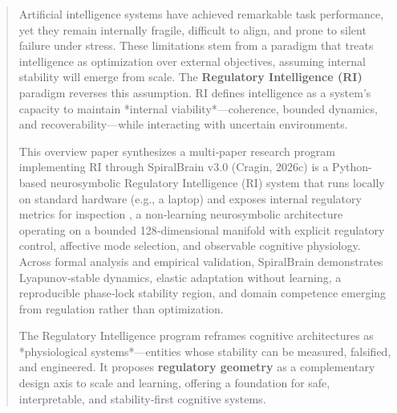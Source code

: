 \documentclass[12pt,a4paper]{report}
\begin{document}
\begin{abstract}

Artificial intelligence systems have achieved remarkable task performance, yet they remain internally fragile, difficult to align, and prone to silent failure under stress. These limitations stem from a paradigm that treats intelligence as optimization over external objectives, assuming internal stability will emerge from scale. The \textbf{Regulatory Intelligence (RI)} paradigm reverses this assumption. RI defines intelligence as a system's capacity to maintain *internal viability*—coherence, bounded dynamics, and recoverability—while interacting with uncertain environments.  

This overview paper synthesizes a multi‑paper research program implementing RI through SpiralBrain v3.0 (Cragin, 2026c) is a Python-based neurosymbolic Regulatory Intelligence (RI) system that runs locally on standard hardware (e.g., a laptop) and exposes internal regulatory metrics for inspection \cite{SpiralBrainV3,Cragin2026RI}, a non‑learning neurosymbolic architecture operating on a bounded 128‑dimensional manifold with explicit regulatory control, affective mode selection, and observable cognitive physiology. Across formal analysis and empirical validation, SpiralBrain demonstrates Lyapunov‑stable dynamics, elastic adaptation without learning, a reproducible phase‑lock stability region, and domain competence emerging from regulation rather than optimization.  

The Regulatory Intelligence program reframes cognitive architectures \cite{Newell1972} as *physiological systems*—entities whose stability can be measured, falsified, and engineered. It proposes \textbf{regulatory geometry} as a complementary design axis to scale and learning, offering a foundation for safe, interpretable, and stability‑first cognitive systems.

\begin{figure}[H]
  \centering
\end{figure}
\end{abstract}
\end{document}

